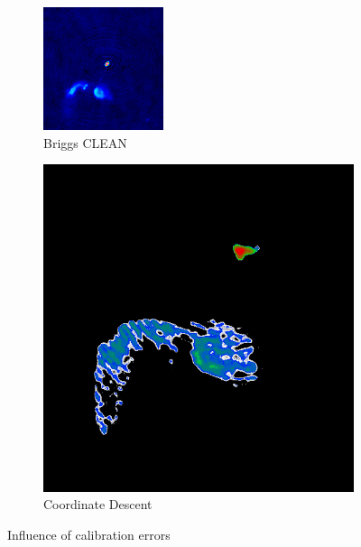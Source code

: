 \begin{figure}[h]
	\centering
	\begin{subfigure}[b]{0.3\linewidth}
		\includegraphics[width=1.00\linewidth]{./chapters/10.results/cleancomp/clean_calibration.png}
		\caption{Briggs CLEAN}
	\end{subfigure}
	\begin{subfigure}[b]{0.3\linewidth}
		\includegraphics[width=1.00\linewidth]{./chapters/10.results/cleancomp/cd_calibration.png}
		\caption{Coordinate Descent}
	\end{subfigure}
	\caption{Influence of calibration errors}
	\label{results:cleancomp::calib:figure}
\end{figure}

